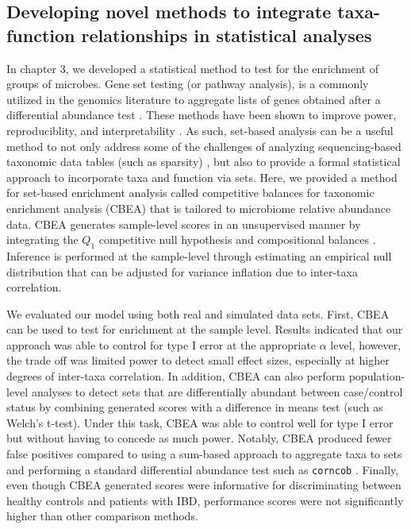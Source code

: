\subsection{Developing novel methods to integrate taxa-function relationships in statistical analyses}

In chapter 3, we developed a statistical method to test for the enrichment of groups of microbes. Gene set testing (or pathway analysis), is a commonly utilized in the genomics literature to aggregate lists of genes obtained after a differential abundance test \cite{irizarry2009gene, goeman2007analyzing}. These methods have been shown to improve power, reproduciblity, and interpretability \cite{khatri2012ten}. As such, set-based analysis can be a useful method to not only address some of the challenges of analyzing sequencing-based taxonomic data tables (such as sparsity) \cite{li2015microbiome}, but also to provide a formal statistical approach to incorporate taxa and function via sets. Here, we provided a method for set-based enrichment analysis called competitive balances for taxonomic enrichment analysis (CBEA) that is tailored to microbiome relative abundance data. CBEA generates sample-level scores in an unsupervised manner by integrating the $Q_1$ competitive null hypothesis \cite{tian2005discovering} and compositional balances \cite{silverman2017phylogenetic, egozcue2003isometric}. Inference is performed at the sample-level through estimating an empirical null distribution that can be adjusted for variance inflation due to inter-taxa correlation. 

We evaluated our model using both real and simulated data sets. First, CBEA can be used to test for enrichment at the sample level. Results indicated that our approach was able to control for type I error at the appropriate $\alpha$ level, however, the trade off was limited power to detect small effect sizes, especially at higher degrees of inter-taxa correlation. In addition, CBEA can also perform population-level analyses to detect sets that are differentially abundant between case/control status by combining generated scores with a difference in means test (such as Welch's t-test). Under this task, CBEA was able to control well for type I error but without having to concede as much power. Notably, CBEA produced fewer false positives compared to using a sum-based approach to aggregate taxa to sets and performing a standard differential abundance test such as \texttt{corncob} \cite{martin2020modeling}. Finally, even though CBEA generated scores were informative for discriminating between healthy controls and patients with IBD, performance scores were not significantly higher than other comparison methods.  

